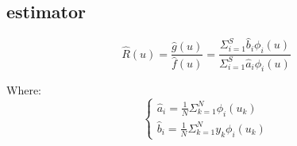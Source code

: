 \subsection{estimator}


\begin{equation}
    \hat{R}(u) = \frac{\hat{g}(u)}{\hat{f}(u)} = \frac{\Sigma^{S}_{i=1}\hat{b}_i \phi_i(u)}{ \Sigma^{S}_{i=1}\hat{a}_i \phi_i(u)  }
\end{equation}


Where:
\begin{equation}
    \begin{cases}
        \hat{a}_i = \frac{1}{N}\Sigma^{N}_{k=1}\phi_i(u_k)\\
        \hat{b}_i = \frac{1}{N}\Sigma^{N}_{k=1}y_k \phi_i(u_k)
    \end{cases}
\end{equation}


